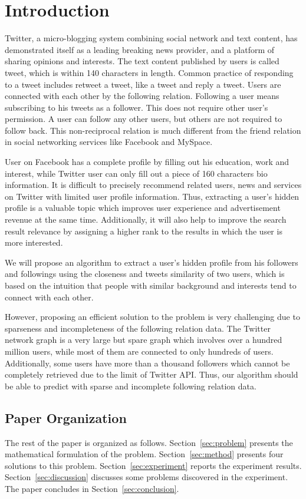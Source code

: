 \section{Introduction}

Twitter, a micro-blogging system combining social network and text content, has demonstrated itself as a leading breaking news provider, and a platform of sharing opinions and interests. The text content published by users is called tweet, which is within 140 characters in length. Common practice of responding to a tweet includes retweet a tweet, like a tweet and reply a tweet. Users are connected with each other by the following relation. Following a user means subscribing to his tweets as a follower. This does not require other user's permission. A user can follow any other users, but others are not required to follow back. This non-reciprocal relation is much different from the friend relation in social networking services like Facebook and MySpace.

User on Facebook has a complete profile by filling out his education, work and interest, while Twitter user can only fill out a piece of 160 characters bio information. It is difficult to precisely recommend related users, news and services on Twitter with limited user profile information. Thus, extracting a user's hidden profile is a valuable topic which improves user experience and advertisement revenue at the same time. Additionally, it will also help to improve the search result relevance by assigning a higher rank to the results in which the user is more interested.

We will propose an algorithm to extract a user's hidden profile from his followers and followings using the closeness and tweets similarity of two users, which is based on the intuition that people with similar background and interests tend to connect with each other.

However, proposing an efficient solution to the problem is very challenging due to sparseness and incompleteness of the following relation data. The Twitter network graph is a very large but spare graph which involves over a hundred million users, while most of them are connected to only hundreds of users. Additionally, some users have more than a thousand followers which cannot be completely retrieved due to the limit of Twitter API. Thus, our algorithm should be able to predict with sparse and incomplete following relation data.

\subsection{Paper Organization}

The rest of the paper is organized as follows.
Section~\ref{sec:problem} presents the mathematical formulation of the problem. Section~\ref{sec:method} presents four solutions to this problem. Section~\ref{sec:experiment} reports the experiment results. Section~\ref{sec:discussion} discusses some problems discovered in the experiment. The paper concludes in Section~\ref{sec:conclusion}.

